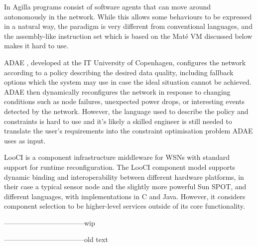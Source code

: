 In Agilla \cite{Fok:2005bh} programs consist of software agents that can move around autonomously in the network. While this allows some behaviours to be expressed in a natural way, the paradigm is very different from conventional languages, and the assembly-like instruction set which is based on the Maté VM \cite{Levis:2002ku} discussed below makes it hard to use.

ADAE \cite{Chang:2010ek}, developed at the IT University of Copenhagen, configures the network according to a policy describing the desired data quality, including fallback options which the system may use in case the ideal situation cannot be achieved. ADAE then dynamically reconfigures the network in response to changing conditions such as node failures, unexpected power drops, or interesting events detected by the network. However, the language used to describe the policy and constraints is hard to use and it’s likely a skilled engineer is still needed to translate the user’s requirements into the constraint optimisation problem ADAE uses as input.


LooCI \cite{Hughes:dg} is a component infrastructure middleware for WSNs with standard support for runtime reconfiguration. The LooCI component model supports dynamic binding and interoperability between different hardware platforms, in their case a typical sensor node and the slightly more powerful Sun SPOT, and different languages, with implementations in C and Java. However, it considers component selection to be higher-level services outside of its core functionality.

-----------------------------------wip







-----------------------------------old text

